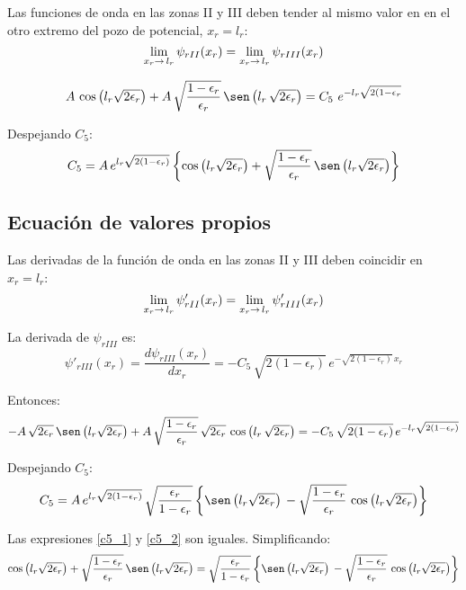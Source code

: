 Las funciones de onda en las zonas II y III deben tender al mismo valor en
en el otro extremo del pozo de potencial, $x_r=l_r$:
\[
\lim_{\scriptsize x_r\to\,l_r} \psi_{rII}(x_r)
=
\lim_{\scriptsize x_r\to\,l_r} \psi_{rIII}(x_r)
\]

\[
A\,\cos\left(l_r\sqrt{2\epsilon_r}\right)
 + A\,\sqrt{\frac{1-\epsilon_r}{\epsilon_r}}
   \,\sen\left(l_r\,\sqrt{2\epsilon_r}\right)
=
C_5\,\,e^{-l_r\sqrt{2(1-\epsilon_r}}
\]

Despejando $C_5$:
\begin{equation}
\label{c5_1}
C_5 = A\,e^{l_r\sqrt{2(1-\epsilon_r)}}
  \left\lbrace\cos\left(l_r\sqrt{2\epsilon_r}\right) 
  + \sqrt{\frac{1-\epsilon_r}{\epsilon_r}}\,
         \sen\left(l_r\sqrt{2\epsilon_r}\right)\right\rbrace
\end{equation}

\subsection{Ecuación de valores propios}
Las derivadas de la función de onda en las zonas II y III deben coincidir en
$x_r=l_r$:
\[
\lim_{\scriptsize x_r\to\,l_r} \psi'_{rII}(x_r)
=
\lim_{\scriptsize x_r\to\,l_r} \psi'_{rIII}(x_r)
\]

La derivada de $\psi_{rIII}$ es:
\[
\psi'_{rIII}(x_r) = \frac{d\psi_{rIII}(x_r)}{dx_r}
  = -C_5\,\sqrt{2(1-\epsilon_r)}\,e^{-\sqrt{2(1-\epsilon_r)}\,x_r}
\]

Entonces:
\[
-A\,\sqrt{2\epsilon_r}\,\sen\left(l_r\sqrt{2\epsilon_r}\right)
 + A\,\sqrt{\frac{1-\epsilon_r}{\epsilon_r}}\,\sqrt{2\epsilon_r}
   \,\cos\left(l_r\,\sqrt{2\epsilon_r}\right)
=
-C_5\,\sqrt{2(1-\epsilon_r)}\,e^{-l_r\sqrt{2(1-\epsilon_r)}}
\]

Despejando $C_5$:
\begin{equation}
\label{c5_2}
C_5 = A\,e^{l_r\sqrt{2(1-\epsilon_r)}}\,\sqrt{\frac{\epsilon_r}{1-\epsilon_r}}
  \left\lbrace\sen\left(l_r\sqrt{2\epsilon_r}\right)\,
  - \sqrt{\frac{1-\epsilon_r}{\epsilon_r}}\,
       \cos\left(l_r\sqrt{2\epsilon_r}\right)\right\rbrace
\end{equation}

Las expresiones \ref{c5_1} y \ref{c5_2} son iguales. Simplificando:
\[
\cos\left(l_r\sqrt{2\epsilon_r}\right) 
  + \sqrt{\frac{1-\epsilon_r}{\epsilon_r}}\,
         \sen\left(l_r\sqrt{2\epsilon_r}\right)
=
\sqrt{\frac{\epsilon_r}{1-\epsilon_r}}
  \left\lbrace\sen\left(l_r\sqrt{2\epsilon_r}\right)\,
  - \sqrt{\frac{1-\epsilon_r}{\epsilon_r}}\,
       \cos\left(l_r\sqrt{2\epsilon_r}\right)\right\rbrace
\]

